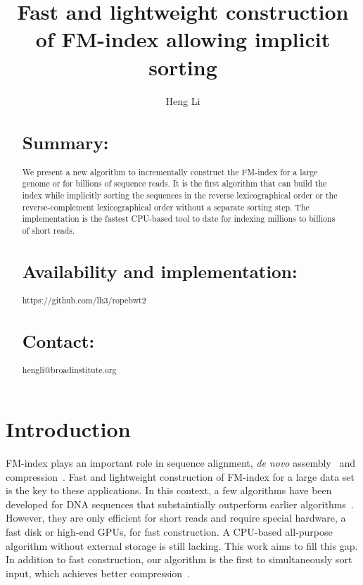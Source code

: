 \documentclass{bioinfo-pre}
\begin{document}

\title[Constructing BWT]{Fast and lightweight construction of FM-index allowing implicit sorting}

\author[Li]{Heng Li}

\address{Broad Institute, 7 Cambridge Center, Cambridge, MA 02142, USA}

\maketitle

\begin{abstract}
\section{Summary:} We present a new algorithm to incrementally construct the
FM-index for a large genome or for billions of sequence reads. It is the first
algorithm that can build the index while implicitly sorting the sequences in
the reverse lexicographical order or the reverse-complement
lexicographical order without a separate sorting step. The
implementation is the fastest CPU-based tool to date for indexing millions to
billions of short reads.

\section{Availability and implementation:} https://github.com/lh3/ropebwt2

\section{Contact:} hengli@broadinstitute.org
\end{abstract}

\section{Introduction}

FM-index plays an important role in sequence alignment, {\it de novo}
assembly~\citep{Simpson:2012aa} and compression~\citep{Cox:2012ly}. Fast
and lightweight construction of FM-index for a large data set is the key to
these applications. In this context, a few algorithms have been developed for
DNA sequences that substaintially outperform earlier
algorithms~\citep{DBLP:journals/tcs/BauerCR13,DBLP:journals/corr/LiuLL14}.
However, they are only efficient for short reads and require special hardware,
a fast disk or high-end GPUs, for fast construction. A CPU-based all-purpose
algorithm without external storage is still lacking. This work aims to fill
this gap. In addition to fast construction, our algorithm is the first to
simultaneously sort input, which achieves better compression~\citep{Cox:2012ly}.
\end{document}
